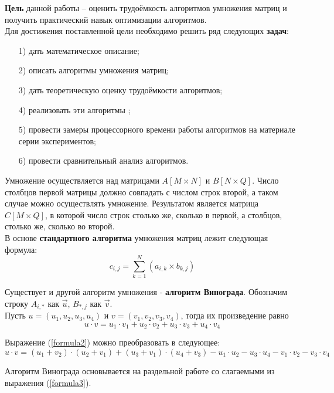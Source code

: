 \textbf{Цель} данной работы – оценить трудоёмкость алгоритмов умножения матриц и получить практический навык оптимизации алгоритмов.\\

Для достижения поставленной цели необходимо решить ряд следующих \textbf{задач}:
\begin{enumerate}
\item[1)] дать математическое описание;
\item[2)] описать алгоритмы умножения матриц;
\item[3)] дать теоретическую оценку трудоёмкости алгоритмов;
\item[4)] реализовать эти алгоритмы ;
\item[5)] провести замеры процессорного времени работы алгоритмов на материале серии экспериментов;
\item[6)] провести сравнительный анализ алгоритмов.
\end{enumerate}

Умножение осуществляется над матрицами $A[M \times N]$ и $B[N \times Q]$. Число столбцов первой матрицы должно совпадать с числом строк второй, а таком случае можно осуществлять умножение. Результатом является матрица $C[M \times Q]$, в которой число строк столько же, сколько в первой, а столбцов, столько же, сколько во второй.\\

В основе \textbf{стандартного алгоритма} умножения матриц лежит следующая формула:
\begin{equation}\label{formula1}
	c_{i,j} = \sum_{k=1}^{N}(a_{i,k} \times b_{k,j})
\end{equation}

Существует и другой алгоритм умножения - \textbf{алгоритм Винограда}.
Обозначим строку $A_{i,*}$ как $\overrightarrow{u}$, $B_{*,j}$ как $\overrightarrow{v}$.\\

Пусть $u = (u_1, u_2, u_3, u_4)$ и $v = (v_1, v_2, v_3, v_4)$, тогда их произведение равно\\
\begin{equation}\label{formula2}
u \cdot v = u_1 \cdot v_1 + u_2 \cdot v_2 + u_3 \cdot v_3 + u_4 \cdot v_4
\end{equation}

Выражение (\ref{formula2}) можно преобразовать в следующее: 
\begin{equation}\label{formula3}
	u \cdot v = (u_1 + v_2)\cdot(u_2 + v_1) + (u_3 + v_1)\cdot(u_4 + v_3) - u_1\cdot u_2 - u_3\cdot u_4 - v_1\cdot v_2 - v_3\cdot v_4
\end{equation}

Алгоритм Винограда основывается на раздельной работе со слагаемыми из выражения (\ref{formula3}). 